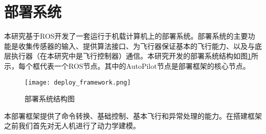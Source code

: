 \section{部署系统}
本研究基于ROS开发了一套运行于机载计算机上的部署系统。部署系统的主要功能是收集传感器的输入、提供算法接口、为飞行器保证基本的飞行能力、以及与底层执行器（在本研究中是飞行控制器）通信。本研究开发的部署系统结构如图\ref{fig_deploy_framework}所示，每个框代表一个ROS节点。其中的AutoPilot节点是部署框架的核心节点。
\begin{figure}
    \centering
    \texttt{[image: deploy\_framework.png]}
    \caption{部署系统结构图}
    \label{fig_deploy_framework}
\end{figure}
本部署框架提供了命令转换、基础控制、基本飞行和异常处理的能力。在搭建框架之前我们首先对无人机进行了动力学建模。

